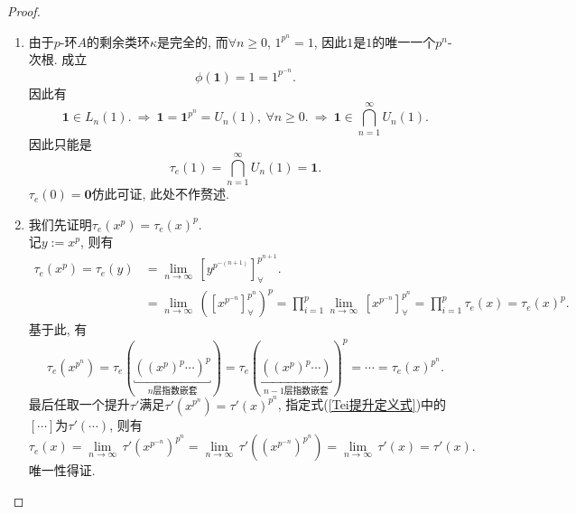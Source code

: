 \documentclass[UTF8, twoside]{ctexart}
\theoremstyle{nonumberplain}
\newtheorem{proof}{\heiti 证明}  %
\theoremstyle{nonumberplain}
\theoremstyle{plain}
\begin{document}
	\begin{proof}
		\ 
		\begin{enumerate}
			\item 由于$p$-环$A$的剩余类环$\kappa $是完全的, 而$\forall n\ge 0$,  ${{1}^{{{p}^{n}}}}=1$, 因此$1$是$1$的唯一一个${{p}^{n}}$-次根. 成立
			\[
				\phi \left( \bm{1} \right)=1={{1}^{{{p}^{-n}}}}.
			\]
			因此有
			\[
				\bm{1}\in {{L}_{n}}\left( 1 \right).
				\ \Longrightarrow \ 
				\bm{1}={\bm{1}^{{{p}^{n}}}}={{U}_{n}}\left( 1 \right),\ \forall n\ge 0.
				\ \Longrightarrow \ 
				\bm{1}\in \bigcap\limits_{n=1}^{\infty }{{{U}_{n}}\left( 1 \right)}.
			\]
			因此只能是
			\[
				{{\tau }_{e}}\left( 1 \right)=\bigcap\limits_{n=1}^{\infty }{{{U}_{n}}\left( 1 \right)}=\bm{1}.
			\]
			${{\tau }_{e}}\left( 0 \right)=\bm{0}$仿此可证, 此处不作赘述. 
			\vskip 0.3cm
			
			\item 我们先证明${{\tau }_{e}}\left( {{x}^{p}} \right)={{\tau }_{e}}{{\left( x \right)}^{p}}$. \\
			记$y:={{x}^{p}}$, 则有
			\begin{align*}
				\tau_e \left( {{x}^{p}} \right)=\tau_e \left( y \right)&=\underset{n\to \infty }{\mathop{\lim }}\,\left[ {{y}^{{{p}^{-\left( n+1 \right)}}}} \right]_{\forall }^{{{p}^{n+1}}}. \\ 
				&=\underset{n\to \infty }{\mathop{\lim }}\,{{\left( \left[ {{x}^{{{p}^{-n}}}} \right]_{\forall }^{{{p}^{n}}} \right)}^{p}}=\prod\limits_{i=1}^{p}{\underset{n\to \infty }{\mathop{\lim }}\,\left[ {{x}^{{{p}^{-n}}}} \right]_{\forall }^{{{p}^{n}}}}=\prod\limits_{i=1}^{p}{\tau_e \left( x \right)}=\tau_e {{\left( x \right)}^{p}}.
			\end{align*}
			基于此, 有
			\[
				{{\tau }_{e}}\left( {{x}^{{{p}^{n}}}} \right)={{\tau }_{e}}\left( \underbracket{{{\left( {{\left( {{x}^{p}} \right)}^{p}}\cdots  \right)}^{p}}}_{n\text{层指数嵌套}} \right)={{\tau }_{e}}{{\left( \underbracket{\left( {{\left( {{x}^{p}} \right)}^{p}}\cdots  \right)}_{{n-1\text{层指数嵌套}}} \right)}^{p}}=\cdots ={{\tau }_{e}}{{\left( x \right)}^{{{p}^{n}}}}.
			\]
			最后任取一个提升$\tau '$满足$\tau '\left( {{x}^{{{p}^{n}}}} \right)=\tau '{{\left( x \right)}^{{{p}^{n}}}}$, 指定式(\ref{Tei提升定义式})中的$\left[ \cdots  \right]$为$\tau '\left( \cdots  \right)$, 则有
			\[
			{{\tau }_{e}}\left( x \right)=\underset{n\to \infty }{\mathop{\lim }}\,\tau '{{\left( {{x}^{{{p}^{-n}}}} \right)}^{{{p}^{n}}}}=\underset{n\to \infty }{\mathop{\lim }}\,\tau '\left( {{\left( {{x}^{{{p}^{-n}}}} \right)}^{{{p}^{n}}}} \right)=\underset{n\to \infty }{\mathop{\lim }}\,\tau '\left( x \right)=\tau '\left( x \right).	
			\]
			唯一性得证.
			\vskip 0.3cm
			

\end{enumerate}
\end{proof}
\end{document}
